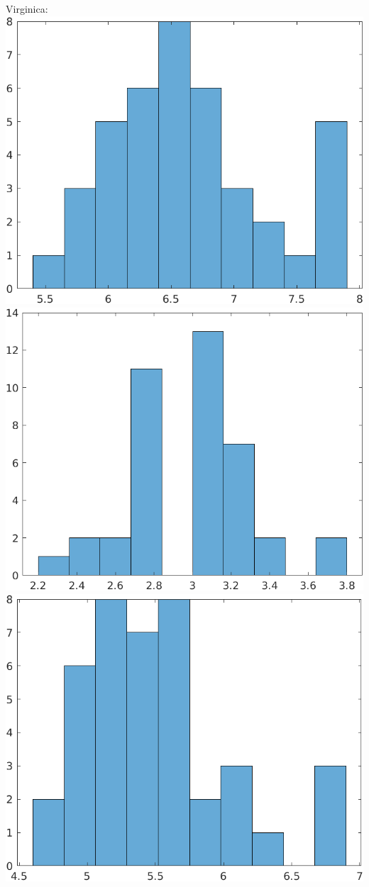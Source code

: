 \documentclass[a4paper]{scrartcl}
\begin{document}
\begin{itemize}
		Virginica:\\
		\includegraphics*[scale=0.2]{assignment2_data/plots/virginica_sl.png}
		\includegraphics*[scale=0.2]{assignment2_data/plots/virginica_sb.png}
		\includegraphics*[scale=0.2]{assignment2_data/plots/virginica_pl.png}

\end{itemize}
\end{document}

